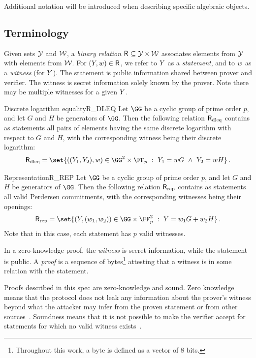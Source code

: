 \documentclass[11pt]{article}
\begin{document}
Additional notation will be introduced when describing specific algebraic objects.
\subsection{Terminology}
Given sets $\Set{Y}$ and $\Set{W}$,
a \emph{binary relation} $\relation \subseteq \Set{Y} \times \Set{W}$ associates elements from $\Set{Y}$ with elements from $\Set{W}$.
For $(\statement,\witness)\in\relation$, we refer to $\statement$ as a \emph{statement}, and to $\witness$ as a \emph{witness} (for $\statement$).
The statement is public information shared between prover and verifier.
The witness is secret information solely known by the prover.
Note there may be multiple witnesses for a given $\statement$.

\begin{example}{Discrete logarithm equality}{R_DLEQ}
  Let $\GG$ be a cyclic group of prime order $p$, and let $G$ and $H$ be generators of $\GG$.
	Then the following relation $\relation[dleq]$ contains as statements all pairs of elements having the same discrete logarithm with respect to $G$ and $H$, with the corresponding witness being their discrete logarithm:
  \[
	  \relation[dleq] = \set{\left((\statement_1,\statement_2),\witness\right) \in \GG^2\times \FF_p~:~\statement_1=\witness G ~\land~ \statement_2=\witness H}\,.
	\]
\end{example}

\begin{example}{Representation}{R_REP}
  Let $\GG$ be a cyclic group of prime order $p$, and let $G$ and $H$ be generators of $\GG$.
	Then the following relation $\relation[rep]$ contains as statements all valid Perdersen commitments, with the corresponding witnesses being their openings:
  \[
	  \relation[rep] = \set{\left(\statement,(\witness_1,\witness_2)\right)\in \GG \times \FF_p^2~:~\statement=\witness_1G + \witness_2H}\,.
	\]
	Note that in this case, each statement has $p$ valid witnesses.
\end{example}

In a zero-knowledge proof, the \emph{witness} is secret information, while the statement is public.
A \emph{proof} is a sequence of bytes\footnote{Throughout this work, a byte is defined as a vector of 8 bits.} attesting that a witness is in some relation with the statement.

Proofs described in this spec are zero-knowledge and sound.
Zero knowledge means that the protocol does not leak any information about the prover's witness beyond what the attacker may infer from the proven statement or from other sources~\cite[1.6.4]{zkproof-reference}.
Soundness means that it is not possible to make the verifier accept for statements for which no valid witness exists~\cite[1.6.2]{zkproof-reference}.
\end{document}
